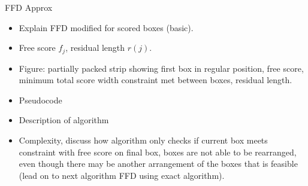 \documentclass[oribibl]{llncs}
\begin{document}
FFD Approx
\begin{itemize}
	\item Explain FFD modified for scored boxes (basic).
	\item Free score $f_j$, residual length $r(j)$.
	\item Figure: partially packed strip showing first box in regular position, free score, minimum total score width constraint met between boxes, residual length.
	\item Pseudocode
	\item Description of algorithm
	\item Complexity, discuss how algorithm only checks if current box meets constraint with free score on final box, boxes are not able to be rearranged, even though there may be another arrangement of the boxes that is feasible (lead on to next algorithm FFD using exact algorithm).	
\end{itemize}
\end{document}
